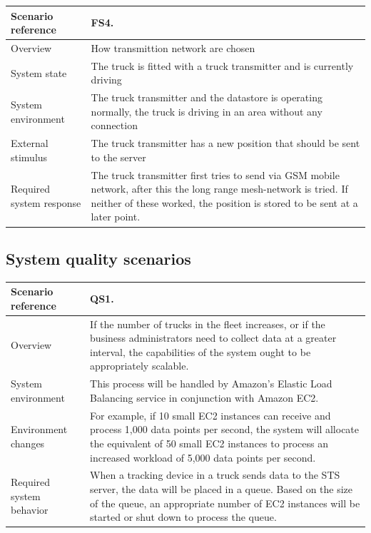 \documentclass[a4paper,11pt]{report}
\begin{document}
\begin{center}
  \begin{tabular}[h!]{| >{\columncolor{gray}}p{} | p{} |}
    \hline
    Scenario reference & FS4. \\
    \hline
    Overview & How transmittion network are chosen \\
    \hline
    System state & The truck is fitted with a truck transmitter and is currently driving\\
    \hline
    System environment & The truck transmitter and the datastore is operating normally, the truck is driving in an area without any connection\\
    \hline
    External stimulus & The truck transmitter has a new position that should be sent to the server \\
    \hline
    Required system response & The truck transmitter first tries to send via GSM mobile network, after this the long range mesh-network is tried. If neither of these worked, the position is stored to be sent at a later point. \\
    \hline
  \end{tabular}
\end{center}

\subsection{System quality scenarios}
\label{sec:syst-qual-scen}

\begin{center}
  \begin{tabular}[h!]{| >{\columncolor{gray}}p{} | p{} |}
    \hline
    Scenario reference & QS1. \\
    \hline
    Overview & If the number of trucks in the fleet increases, or if the business
    administrators need to collect data at a greater interval, the capabilities
    of the system ought to be appropriately scalable.\\
    \hline
    System environment & This process will be handled
    by Amazon's Elastic Load Balancing service in conjunction with Amazon EC2.\\
    \hline
    Environment changes & For example, if 10 small EC2
    instances can receive and process 1,000 data points per second, the system will
    allocate the equivalent of 50 small EC2 instances to process an increased
    workload of 5,000 data points per second.\\
    \hline
    Required system behavior & When a tracking device in
    a truck sends data to the STS server, the data will be placed in a queue.
    Based on the size of the queue, an appropriate number of EC2 instances will
    be started or shut down to process the queue.\\
    \hline
  \end{tabular}
\end{center}
\end{document}
